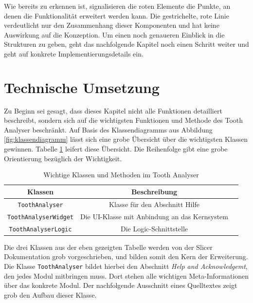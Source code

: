 Wie bereits zu erkennen ist, signalisieren die roten Elemente die Punkte, an
denen die Funktionalität erweitert werden kann. Die gestrichelte, rote Linie
verdeutlicht nur den Zusammenhang dieser Komponenten und hat keine Auswirkung
auf die Konzeption. Um einen noch genaueren Einblick in die Strukturen zu geben,
geht das nachfolgende Kapitel noch einen Schritt weiter und geht auf konkrete
Implementierungsdetails ein.

\pagebreak

\section{Technische Umsetzung}
\label{sec:technische_umsetzung} Zu Beginn sei gesagt, dass dieses Kapitel nicht
alle Funktionen detailliert beschreibt, sondern sich auf die wichtigsten Funktionen
und Methode des Tooth Analyser beschränkt. Auf Basis des Klassendiagramms aus
Abbildung \ref{fig:klassendiagramm} lässt sich eine grobe Übersicht über die
wichtigsten Klassen gewinnen. Tabelle \ref{tab:methoden_klassen} leifert diese Übersicht.
Die Reihenfolge gibt eine grobe Orientierung bezüglich der Wichtigkeit.

\begin{table}[h]
	\centering
	\begin{tabular}{|c|c|c|}
		\hline
		\textbf{Klassen}             & \textbf{Beschreibung}                              \\
		\hline
		\texttt{ToothAnalyser}       & Klasse für den Abschnitt Hilfe                     \\
		\hline
		\texttt{ToothAnalyserWidget} & Die \ac{UI}-Klasse mit Anbindung an das Kernsystem \\
		\hline
		\texttt{ToothAnalyserLogic}  & Die Logic-Schnittstelle                            \\
		\hline
	\end{tabular}
	\caption{Wichtige Klassen und Methoden im Tooth Analyser}
	\label{tab:methoden_klassen}
\end{table}

Die drei Klassen aus der eben gezeigten Tabelle werden von der Slicer Dokumentation
grob vorgeschrieben, und bilden somit den Kern der Erweiterung. Die Klasse \texttt{ToothAnalyser}
bildet hierbei den Abschnitt \textit{Help and Acknowledgemt}, den jedes Modul
mitbringen muss. Dort stehen alle wichtigen Meta-Informationen über das konkrete
Modul. Der nachfolgende Ausschnitt eines Quelltextes zeigt grob den Aufbau
dieser Klasse.

